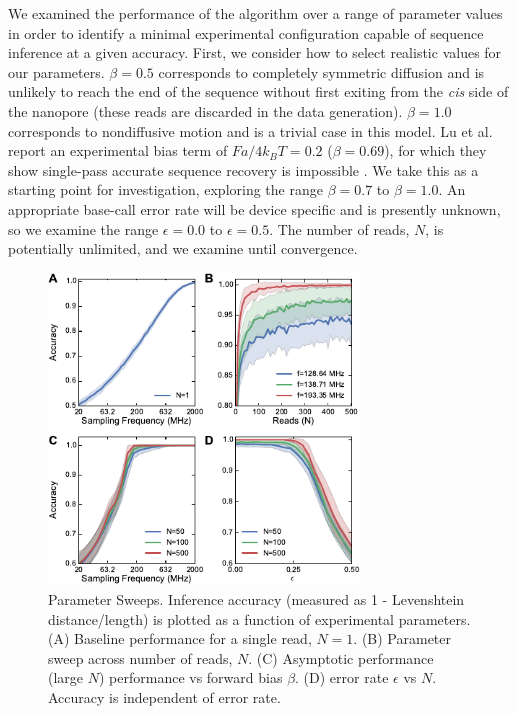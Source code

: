 \documentclass{biophys_letter}
\newcommand{\bias}{\beta}
\newcommand{\err}{\epsilon}
\begin{document}
We examined the performance of the algorithm over a range of parameter values in order to identify a minimal experimental configuration capable of sequence inference at a given accuracy.
First, we consider how to select realistic values for our parameters.
$\bias=0.5$ corresponds to completely symmetric diffusion and is unlikely to reach the end of the sequence without first exiting from the {\it cis} side of the nanopore (these reads are discarded in the data generation).
$\bias=1.0$ corresponds to nondiffusive motion and is a trivial case in this model.
Lu et al. report an experimental bias term of $Fa/4k_{B}T=0.2$ ($\bias=0.69$), for which they show single-pass accurate sequence recovery is impossible \cite{Lu:2011}.
We take this as a starting point for investigation, exploring the range $\bias=0.7$ to $\bias=1.0$.
An appropriate base-call error rate will be device specific and is presently unknown, so we examine the range $\err=0.0$ to $\err=0.5$.
The number of reads, $N$, is potentially unlimited, and we examine until convergence.

\begin{figure}
  \centering
  \includegraphics[width=3.25in]{fig/fig3_new.pdf}
  \caption{Parameter Sweeps. Inference accuracy (measured as 1 - Levenshtein distance/length) is plotted as a function of experimental parameters. (A) Baseline performance for a single read, $N=1$. (B) Parameter sweep across number of reads, $N$. (C) Asymptotic performance (large $N$) performance vs forward bias $\bias$. (D) error rate $\err$ vs $N$. Accuracy is independent of error rate.}
  \label{fig:parameter_sweeps}
\end{figure}
\end{document}
